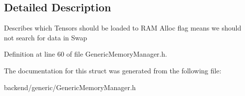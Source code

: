 \subsection{Detailed Description}
Describes which Tensors should be loaded to R\+AM Alloc flag means we should not search for data in Swap 

Definition at line 60 of file Generic\+Memory\+Manager.\+h.



The documentation for this struct was generated from the following file\+:\begin{DoxyCompactItemize}
\item 
backend/generic/Generic\+Memory\+Manager.\+h\end{DoxyCompactItemize}

